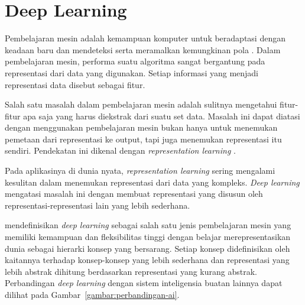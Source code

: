 \section{Deep Learning}
Pembelajaran mesin adalah kemampuan komputer untuk beradaptasi dengan keadaan baru dan mendeteksi serta meramalkan kemungkinan pola \citep{Russell:2009:AIM:1671238}. Dalam pembelajaran mesin, performa suatu algoritma sangat bergantung pada representasi dari data yang digunakan. Setiap informasi yang menjadi representasi data disebut sebagai fitur.

Salah satu masalah dalam pembelajaran mesin adalah sulitnya mengetahui fitur-fitur apa saja yang harus diekstrak dari suatu set data. Masalah ini dapat diatasi dengan menggunakan pembelajaran mesin bukan hanya untuk menemukan pemetaan dari representasi ke output, tapi juga menemukan representasi itu sendiri. Pendekatan ini dikenal dengan \textit{representation learning} \citep{goodfellow-2016}.

Pada aplikasinya di dunia nyata, \textit{representation learning} sering mengalami kesulitan dalam menemukan representasi dari data yang kompleks. \textit{Deep learning} mengatasi masalah ini dengan membuat representasi yang disusun oleh representasi-representasi lain yang lebih sederhana.

\citeauthor{goodfellow-2016} mendefinisikan \textit{deep learning} sebagai salah satu jenis pembelajaran mesin yang memiliki kemampuan dan fleksibilitas tinggi dengan belajar merepresentasikan dunia sebagai hierarki konsep yang bersarang. Setiap konsep didefinisikan oleh kaitannya terhadap konsep-konsep yang lebih sederhana dan representasi yang lebih abstrak dihitung berdasarkan representasi yang kurang abstrak. Perbandingan \textit{deep learning} dengan sistem inteligensia buatan lainnya dapat dilihat pada Gambar~\ref{gambar:perbandingan-ai}.

